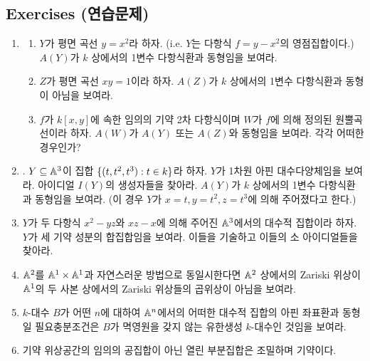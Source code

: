 	
	\begin{remark}
	\end{remark}
	
	
	\subsection*{Exercises (연습문제)}
	
	
	\begin{enumerate}[label=\tb{1.\arabic*.},itemindent=0mm,itemsep=2mm]
	\item \begin{enumerate}[label=(\alph*)]
	\item $Y$가 평면 곡선 $y=x^2$라 하자. (i.e. $Y$는 다항식 $f=y-x^2$의 영점집합이다.)
	$A(Y)$가 $k$ 상에서의 1변수 다항식환과 동형임을 보여라.
	\item $Z$가 평면 곡선 $xy=1$이라 하자. $A(Z)$가 $k$ 상에서의 1변수 다항식환과 동형이 아님을 보여라.
	\end{enumerate}
	\begin{enumerate}[label=*(\alph*)]
	\setcounter{enumii}{2}
	\item $f$가 $k[x,y]$에 속한 임의의 기약 2차 다항식이며 $W$가 $f$에 의해 정의된 원뿔곡선이라 하자.
	$A(W)$가 $A(Y)$ 또는 $A(Z)$와 동형임을 보여라. 각각 어떠한 경우인가?
	\end{enumerate}
	\item {}. $Y\subseteq\mathbb{A}^3$이 집합 $\{(t,t^2,t^3):t\in k\}$라 하자.
	$Y$가 1차원 아핀 대수다양체임을 보여라. 아이디얼 $I(Y)$의 생성자들을 찾아라.
	$A(Y)$가 $k$ 상에서의 1변수 다항식환과 동형임을 보여라.
	(이 경우 $Y$가  $x=t,y=t^2,z=t^3$에 의해 주어졌다고 한다.)
	\item $Y$가 두 다항식 $x^2-yz$와 $xz-x$에 의해 주어진 $\mathbb{A}^3$에서의 대수적 집합이라 하자.
	$Y$가 세 기약 성분의 합집합임을 보여라. 이들을 기술하고 이들의 소 아이디얼들을 찾아라.
	\item $\mathbb{A}^2$를 $\mathbb{A}^1\times\mathbb{A}^1$과 자연스러운 방법으로 동일시한다면
	$\mathbb{A}^2$ 상에서의 Zariski 위상이 $\mathbb{A}^1$의 두 사본 상에서의 Zariski 위상들의 곱위상이 아님을 보여라.
	\item $k$-대수 $B$가 어떤 $n$에 대하여 $\mathbb{A}^n$에서의 어떠한 대수적 집합의 아핀 좌표환과 동형일 필요충분조건은
	$B$가 멱영원을 갖지 않는 유한생성 $k$-대수인 것임을 보여라.
	\item 기약 위상공간의 임의의 공집합이 아닌 열린 부분집합은 조밀하며 기약이다.

\end{enumerate}
